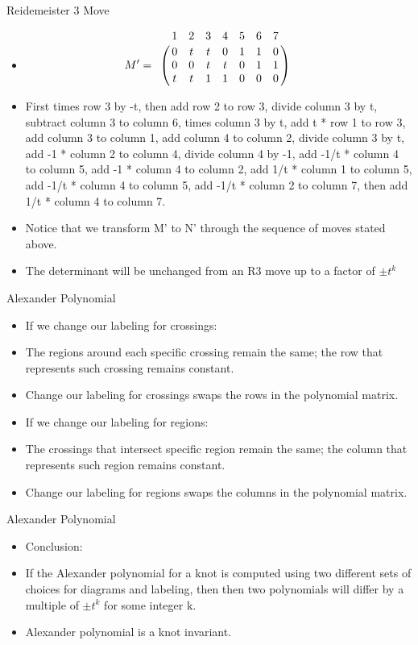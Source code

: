 \documentclass[10pt]{beamer}
\begin{document}
\begin{frame} {Reidemeister 3 Move}
  \begin{itemize}
  \item
  \[
  M'=
  \bordermatrix{ & 1 & 2 & 3 & 4 & 5 & 6 & 7 \cr
  & 0 & t & t & 0 & 1 & 1 & 0  \cr
  & 0 & 0 & t & t & 0 & 1 & 1  \cr
  & t & t & 1 & 1 & 0 & 0 & 0
 } \qquad
  \]
 \item First times row 3 by -t, then add row 2 to row 3, divide column 3 by t, subtract column 3 to column 6, times column 3 by t, add t * row 1 to row 3, add column 3 to column 1, add column 4 to column 2, divide column 3 by t, add -1 * column 2 to column 4, divide column 4 by -1, add -1/t * column 4 to column 5, add -1 * column 4 to column 2, add 1/t * column 1 to column 5, add -1/t * column 4 to column 5, add -1/t * column 2 to column 7, then add 1/t * column 4 to column 7.
  \item Notice that we transform M' to N' through the sequence of moves stated above.
  \item The determinant will be unchanged from an R3 move up to a factor of $ \pm t^k $
  \end{itemize}
\end{frame}


\begin{frame}{Alexander Polynomial}

   \begin{itemize}
\item If we change our labeling for crossings:
\item The regions around each specific crossing remain the same; the row that represents such crossing remains constant.
\item Change our labeling for crossings swaps the rows in the polynomial matrix.
\item If we change our labeling for regions:
\item The crossings that intersect specific region remain the same; the column that represents such region remains constant.
\item Change our labeling for regions swaps the columns in the polynomial matrix.
\end{itemize}
\end{frame}

\begin{frame}{Alexander Polynomial}

   \begin{itemize}
\item Conclusion:
\item If the Alexander polynomial for a knot is computed using two different sets of choices for diagrams and labeling, then then two polynomials will differ by a multiple of $\pm t^k$ for some integer k.

\item Alexander polynomial is a knot invariant.
\end{itemize}
\end{frame}
\end{document}
